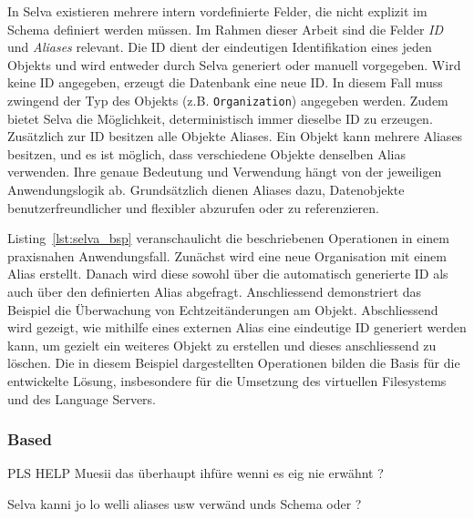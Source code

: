 In Selva existieren mehrere intern vordefinierte Felder, die nicht explizit im Schema definiert werden müssen. Im Rahmen dieser Arbeit sind die Felder \textit{ID} und \textit{Aliases} relevant. Die ID dient der eindeutigen Identifikation eines jeden Objekts und wird entweder durch Selva generiert oder manuell vorgegeben. Wird keine ID angegeben, erzeugt die Datenbank eine neue ID. In diesem Fall muss zwingend der Typ des Objekts (z.B. \texttt{Organization}) angegeben werden. Zudem bietet Selva die Möglichkeit, deterministisch immer dieselbe ID zu erzeugen. Zusätzlich zur ID besitzen alle Objekte Aliases. Ein Objekt kann mehrere Aliases besitzen, und es ist möglich, dass verschiedene Objekte denselben Alias verwenden. Ihre genaue Bedeutung und Verwendung hängt von der jeweiligen Anwendungslogik ab. Grundsätzlich dienen Aliases dazu, Datenobjekte benutzerfreundlicher und flexibler abzurufen oder zu referenzieren.

Listing~\ref{lst:selva_bsp} veranschaulicht die beschriebenen Operationen in einem praxisnahen Anwendungsfall. Zunächst wird eine neue Organisation mit einem Alias erstellt. Danach wird diese sowohl über die automatisch generierte ID als auch über den definierten Alias abgefragt. Anschliessend demonstriert das Beispiel die Überwachung von Echtzeitänderungen am Objekt. Abschliessend wird gezeigt, wie mithilfe eines externen Alias eine eindeutige ID generiert werden kann, um gezielt ein weiteres Objekt zu erstellen und dieses anschliessend zu löschen. Die in diesem Beispiel dargestellten Operationen bilden die Basis für die entwickelte Lösung, insbesondere für die Umsetzung des virtuellen Filesystems und des Language Servers.

\newpage




\subsubsection*{Based}
PLS HELP Muesii das überhaupt ihfüre wenni es eig nie erwähnt ?

Selva kanni jo lo welli aliases usw verwänd unds Schema oder ?